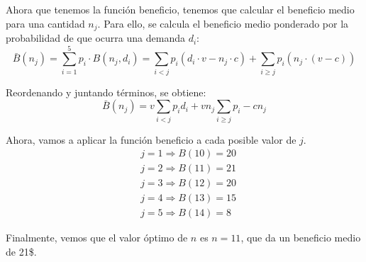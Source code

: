 \documentclass[12pt, letterpaper]{article}
\begin{document}
\newpage
Ahora que tenemos la función beneficio, tenemos que calcular el beneficio medio para una cantidad $n_j$. Para ello, se calcula el beneficio medio ponderado por la probabilidad de que ocurra una demanda $d_i$:
\[
    \bar{B}(n_j) = \sum_{i=1}^{5} p_i \cdot B(n_j,d_i) = 
    \sum_{i<j}p_i(d_i \cdot v - n_j \cdot c) + \sum_{i \geq j}p_i(n_j \cdot (v - c))
\]

Reordenando y juntando términos, se obtiene:
\[
    \bar{B}(n_j) = 
        v\sum_{i<j}p_i d_i + 
        v n_j \sum_{i \geq j} p_i -
        c n_j
\]

Ahora, vamos a aplicar la función beneficio a cada posible valor de $j$.
\begin{align*}
    & j = 1 \Rightarrow B(10) = 20 \\
    & j = 2 \Rightarrow B(11) = 21 \\
    & j = 3 \Rightarrow B(12) = 20 \\
    & j = 4 \Rightarrow B(13) = 15 \\
    & j = 5 \Rightarrow B(14) = 8
\end{align*}

Finalmente, vemos que el valor óptimo de $n$ es $n = 11$, que da un beneficio medio de 21\$.
\end{document}

